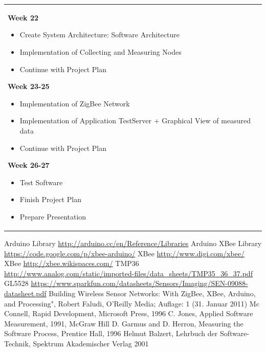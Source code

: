 \documentclass[
	11pt,
	a4paper
]{article}%
\begin{document}
\begin{tabular}{ll}
{\begin{itemize}
\end{itemize}
\large{\textbf{Week 22}}
\begin{itemize}
\item Create System Architecture: Software Architecture
\item Implementation of Collecting and Measuring Nodes
\item Continue with Project Plan 
\end{itemize}
\large{\textbf{Week 23-25}}
\begin{itemize}
\item Implementation of ZigBee Network
\item Implementation of Application TestServer + Graphical View of measured data
\item Continue with Project Plan 
\end{itemize}
\large{\textbf{Week 26-27}}
\begin{itemize}
\item Test Software
\item Finish Project Plan
\item Prepare Presentation
\end{itemize}
 }
\end{tabular}

\newpage
\begin{thebibliography}{9}
\bibitem{}Arduino Library {\url{http://arduino.cc/en/Reference/Libraries}}
\bibitem{}Arduino XBee Library {\url{https://code.google.com/p/xbee-arduino/}}
\bibitem{}XBee {\url{http://www.digi.com/xbee/}}
\bibitem{}XBee {\url{http://xbee.wikispaces.com/}}
\bibitem{}TMP36 {\url{http://www.analog.com/static/imported-files/data_sheets/TMP35_36_37.pdf}}
\bibitem{}GL5528 {\url{https://www.sparkfun.com/datasheets/Sensors/Imaging/SEN-09088-datasheet.pdf}}
Building Wireless Sensor Networks: With ZigBee, XBee, Arduino, and Processing", Robert Faludi, O'Reilly Media; Auflage: 1 (31. Januar 2011)
Mc Connell, Rapid Development, Microsoft Press, 1996
C. Jones, Applied Software Measurement, 1991, McGraw Hill
D. Garmus and D. Herron, Measuring the Software Process, Prentice Hall, 1996
Helmut Balzert, Lehrbuch der Software-Technik, Spektrum Akademischer Verlag 2001
\end{thebibliography}
\end{document}
